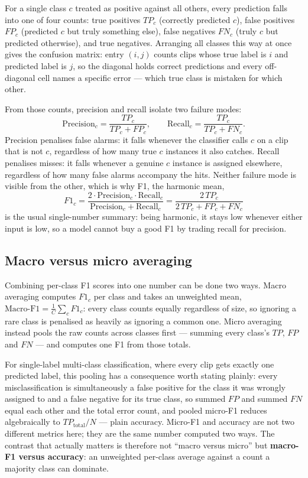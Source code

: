 For a single class $c$ treated as positive against all others, every prediction falls into one of four counts: true positives $TP_c$ (correctly predicted $c$), false positives $FP_c$ (predicted $c$ but truly something else), false negatives $FN_c$ (truly $c$ but predicted otherwise), and true negatives. Arranging all classes this way at once gives the confusion matrix: entry $(i,j)$ counts clips whose true label is $i$ and predicted label is $j$, so the diagonal holds correct predictions and every off-diagonal cell names a specific error --- which true class is mistaken for which other.

From those counts, precision and recall isolate two failure modes:
\[
	\text{Precision}_c = \frac{TP_c}{TP_c + FP_c}, \qquad \text{Recall}_c = \frac{TP_c}{TP_c + FN_c}.
\]
Precision penalises false alarms: it falls whenever the classifier calls $c$ on a clip that is not $c$, regardless of how many true $c$ instances it also catches. Recall penalises misses: it falls whenever a genuine $c$ instance is assigned elsewhere, regardless of how many false alarms accompany the hits. Neither failure mode is visible from the other, which is why F1, the harmonic mean,
\[
	F1_c = \frac{2 \cdot \text{Precision}_c \cdot \text{Recall}_c}{\text{Precision}_c + \text{Recall}_c} = \frac{2\,TP_c}{2\,TP_c + FP_c + FN_c}
\]
is the usual single-number summary: being harmonic, it stays low whenever either input is low, so a model cannot buy a good F1 by trading recall for precision.

\subsection{Macro versus micro averaging}
\label{sec:macro-micro}

Combining per-class F1 scores into one number can be done two ways. Macro averaging computes $F1_c$ per class and takes an unweighted mean, $\text{Macro-F1} = \tfrac1C\sum_c F1_c$: every class counts equally regardless of size, so ignoring a rare class is penalised as heavily as ignoring a common one. Micro averaging instead pools the raw counts across classes first --- summing every class's $TP$, $FP$ and $FN$ --- and computes one F1 from those totals.

For single-label multi-class classification, where every clip gets exactly one predicted label, this pooling has a consequence worth stating plainly: every misclassification is simultaneously a false positive for the class it was wrongly assigned to and a false negative for its true class, so summed $FP$ and summed $FN$ equal each other and the total error count, and pooled micro-F1 reduces algebraically to $TP_{\text{total}}/N$ --- plain accuracy. Micro-F1 and accuracy are not two different metrics here; they are the same number computed two ways. The contrast that actually matters is therefore not ``macro versus micro'' but \textbf{macro-F1 versus accuracy}: an unweighted per-class average against a count a majority class can dominate.

